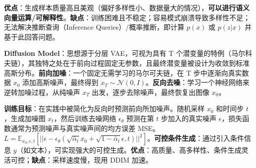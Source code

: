 \documentclass[
  8pt]{extarticle}
\begin{document}
\begin{multicols*}{4}
\textbf{优点}：生成样本质量高且美观（偏好多样性小、数据量大的情况），\textbf{可以进行语义向量运算/可解释性}。\textbf{缺点}：训练困难且不稳定；容易模式崩溃导致多样性不足；无法解决推断查询（Inference
Queries）/概率推断，即计算 \(p(x)\) 或 \(p(z|x)\) 并基于此回答问题。

\textbf{Diffusion Model}：思想源于分层 VAE，可视为具有 T
个潜变量的特例（马尔科夫链），其独特之处在于前向过程固定无参数，且最终潜变量被设计为收敛到标准高斯分布。\textbf{前向加噪}：一个固定无需学习的马尔可夫链，在
T 步中逐渐向真实数据 \(x_0\) 添加高斯噪声，最终得到
\(x_T \sim \mathcal{N}(0, I)\)。\textbf{反向去噪}：学习一个神经网络来逆转加噪过程，从纯噪声
\(x_T\) 出发，逐步去除噪声，最终恢复出图像 \(x_0\)。

\textbf{训练目标}：在实践中被简化为反向时预测前向所加噪声。随机采样
\(x_0\) 和时间步 \(t\)，生成加噪图 \(x_t\)，然后训练去噪网络
\(\epsilon_\theta\) 预测在第 \(t\) 步加入的真实噪声
\(\epsilon\)，损失函数通常为预测噪声与真实噪声间的均方误差
MSE。\(L = \mathbb{E}_{x_0, \epsilon, t} [||\epsilon - \epsilon_\theta(\sqrt{\bar{\alpha}_t}x_0 + \sqrt{1-\bar{\alpha}_t}\epsilon, t)||^2]\)。\textbf{可控条件生成}：通过引入条件信息
\(y\)（如文本），可实现强大的可控生成。\textbf{优点}：高质量、高多样性、条件生成灵活可控；\textbf{缺点}：采样速度慢，现用
DDIM 加速。

\end{multicols*}
\end{document}
